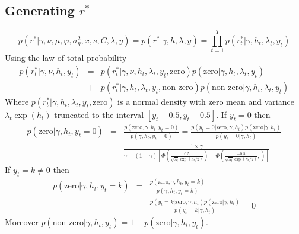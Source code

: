 \documentclass[12pt]{article}
\begin{document}
\subsection{Generating $r^{*}$  }
\begin{equation}
p(r^{*}| \gamma, \nu, \mu ,\varphi,\sigma^{2}_{\eta},x , s, C,\lambda, y)=p(r^{*}| \gamma,h,\lambda, y)= \prod \limits_{t=1}^{T}p(r^{*}_t| \gamma, h_t,\lambda_t ,y_t)
\end{equation}
Using the law of total probability
\begin{eqnarray}
p(r^{*}_t| \gamma, \nu, h_t, y_t)&=&p(r^{*}_t| \gamma, \nu, h_t,\lambda_t, y_t, \text{zero})p(\text{zero}|\gamma, h_t,\lambda_t, y_t)\nonumber \\
&+&p(r^{*}_t| \gamma, h_t,\lambda_t, y_t, \text{non-zero})p(\text{non-zero}|\gamma, h_t,\lambda_t, y_t)
\end{eqnarray}
Where $p(r^{*}_t| \gamma, h_t, \lambda_t, y_t, \text{zero})$ is a normal density with zero mean and variance $\lambda_t \exp(h_t)$  truncated to the interval $[y_t - 0.5, y_t +0.5]$.
If $y_t=0$ then 
\begin{eqnarray}
p(\text{zero}|\gamma, h_t, y_t=0)&=& \frac{p(\text{zero},\gamma, h_t, y_t=0)}{p(\gamma, h_t, y_t=0)}=\frac{p(y_t=0| \text{zero},\gamma, h_t)p(\text{zero}|\gamma, h_t)}{p(y_t=0|\gamma, h_t)}\nonumber \\
&=& \frac{1\times \gamma}{\gamma +(1-\gamma)\left[\Phi\left(\frac{0.5}{\sqrt{\lambda_t}\exp(h_t/2)}\right) -\Phi\left(\frac{-0.5}{\sqrt{\lambda_t}\exp(h_t/2)}, \right)  \right]} 
\end{eqnarray}
If $y_t=k\neq0$ then 
\begin{eqnarray}
p(\text{zero}|\gamma, h_t, y_t=k)&=& \frac{p(\text{zero},\gamma, h_t, y_t=k)}{p(\gamma, h_t, y_t=k)} \nonumber \\
&=&\frac{p(y_t=k| \text{zero},\gamma, h_t)p(\text{zero}|\gamma, h_t)}{p(y_t=k|\gamma, h_t)} =0
\end{eqnarray}
Moreover $p(\text{non-zero}|\gamma ,h_t, y_t)=1-p(\text{zero}|\gamma, h_t, y_t)$.
\end{document}
